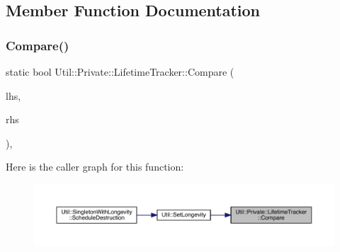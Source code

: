 \subsection{Member Function Documentation}
\mbox{\label{classUtil_1_1Private_1_1LifetimeTracker_aa24d4865c53c4f962183ce31276efd7c}} 
\subsubsection{\texorpdfstring{Compare()}{Compare()}\hspace{0.1cm}{\footnotesize\ttfamily [1/3]}}
{\footnotesize\ttfamily static bool Util\+::\+Private\+::\+Lifetime\+Tracker\+::\+Compare (\begin{DoxyParamCaption}\item[{const \mbox{\hyperlink{classUtil_1_1Private_1_1LifetimeTracker}{Lifetime\+Tracker}} $\ast$}]{lhs,  }\item[{const \mbox{\hyperlink{classUtil_1_1Private_1_1LifetimeTracker}{Lifetime\+Tracker}} $\ast$}]{rhs }\end{DoxyParamCaption})\hspace{0.3cm}{\ttfamily [inline]}, {\ttfamily [static]}}

Here is the caller graph for this function\+:
\nopagebreak
\begin{figure}[H]
\begin{center}
\leavevmode
\includegraphics[width=350pt]{d4/daa/classUtil_1_1Private_1_1LifetimeTracker_aa24d4865c53c4f962183ce31276efd7c_icgraph}
\end{center}
\end{figure}
\mbox{\label{classUtil_1_1Private_1_1LifetimeTracker_aa24d4865c53c4f962183ce31276efd7c}} 

